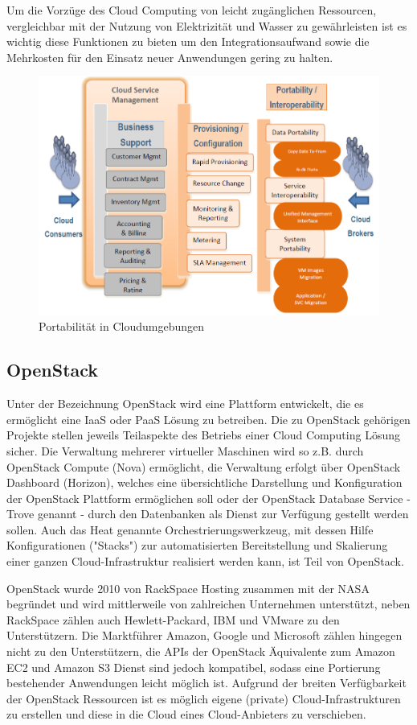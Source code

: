 Um die Vorzüge des Cloud Computing von leicht zugänglichen Ressourcen, vergleichbar mit der Nutzung von Elektrizität und Wasser zu gewährleisten ist es wichtig diese Funktionen zu bieten um den Integrationsaufwand sowie die Mehrkosten für den Einsatz neuer Anwendungen gering zu halten. \cite{openGroup}

\begin{figure}
	\centering
	\includegraphics[width=0.8\linewidth]{images/portability}
	\caption{Portabilität in Cloudumgebungen}
	\label{fig:portability}
\end{figure}

\subsection{OpenStack}
Unter der Bezeichnung OpenStack wird eine Plattform entwickelt, die es ermöglicht eine IaaS oder PaaS Lösung zu betreiben. Die zu OpenStack gehörigen Projekte stellen jeweils Teilaspekte des Betriebs einer Cloud Computing Lösung sicher. Die Verwaltung mehrerer virtueller Maschinen wird so z.B. durch OpenStack Compute (Nova) ermöglicht, die Verwaltung erfolgt über OpenStack Dashboard (Horizon), welches eine übersichtliche Darstellung und Konfiguration der OpenStack Plattform ermöglichen soll oder der OpenStack Database Service - Trove genannt - durch den Datenbanken als Dienst zur Verfügung gestellt werden sollen. Auch das Heat genannte Orchestrierungswerkzeug, mit dessen Hilfe Konfigurationen ("Stacks") zur automatisierten Bereitstellung und Skalierung einer ganzen Cloud-Infrastruktur realisiert werden kann, ist Teil von OpenStack.

OpenStack wurde 2010 von RackSpace Hosting zusammen mit der NASA begründet und wird mittlerweile von zahlreichen Unternehmen unterstützt, neben RackSpace zählen auch Hewlett-Packard, IBM und VMware zu den Unterstützern. Die Marktführer Amazon, Google und Microsoft zählen hingegen nicht zu den Unterstützern, die APIs der OpenStack Äquivalente zum Amazon EC2 und Amazon S3 Dienst sind jedoch kompatibel, sodass eine Portierung bestehender Anwendungen leicht möglich ist. Aufgrund der breiten Verfügbarkeit der OpenStack Ressourcen ist es möglich eigene (private) Cloud-Infrastrukturen zu erstellen und diese in die Cloud eines Cloud-Anbieters zu verschieben.

